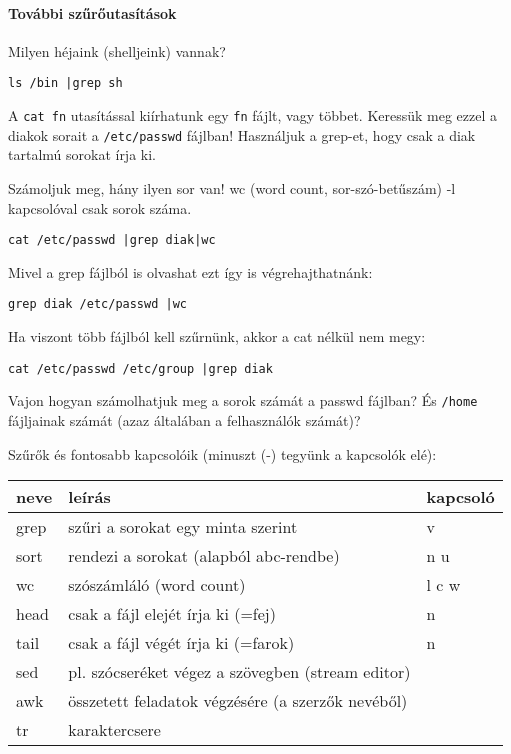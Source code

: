 \documentclass[a4paper]{article}
\newcommand{\code}{\texttt}
\begin{document}
\paragraph{További szűrőutasítások}

Milyen héjaink (shelljeink) vannak?
\begin{Verbatim}
ls /bin |grep sh
\end{Verbatim}

A \code{cat fn} utasítással kiírhatunk egy \code{fn} fájlt, vagy többet. Keressük meg ezzel
a diakok sorait a \code{/etc/passwd} fájlban! Használjuk a grep-et, hogy csak a
diak tartalmú sorokat írja ki.

Számoljuk meg, hány ilyen sor van! wc (word count, sor-szó-betűszám) -l
kapcsolóval csak sorok száma.
\begin{Verbatim}
cat /etc/passwd |grep diak|wc
\end{Verbatim}

Mivel a grep fájlból is olvashat ezt így is végrehajthatnánk:
\begin{Verbatim}
grep diak /etc/passwd |wc
\end{Verbatim}
Ha viszont több fájlból kell szűrnünk, akkor a cat nélkül nem megy:
\begin{Verbatim}
cat /etc/passwd /etc/group |grep diak
\end{Verbatim}


Vajon hogyan számolhatjuk meg a sorok számát a passwd fájlban? És
\code{/home} fájljainak számát (azaz általában a felhasználók számát)?

Szűrők és fontosabb kapcsolóik (minuszt (-) tegyünk a kapcsolók elé):\\
\begin{tabular}{lll}
\hline
\textbf{neve}& \textbf{leírás} & \textbf{kapcsoló}\\
\hline
grep & szűri a sorokat egy minta szerint&v\\
\hline
sort &rendezi a sorokat (alapból abc-rendbe)&n u\\
\hline
wc & szószámláló (word count)&l c w\\
\hline
head & csak a fájl elejét írja ki (=fej)&n\\
\hline
tail & csak a fájl végét írja ki (=farok)&n\\
\hline
\hline
sed & pl. szócseréket végez a szövegben (stream editor)&\\
\hline
awk & összetett feladatok végzésére (a szerzők nevéből)&\\
\hline
tr & karaktercsere&\\
\hline
\end{tabular}
\end{document}

